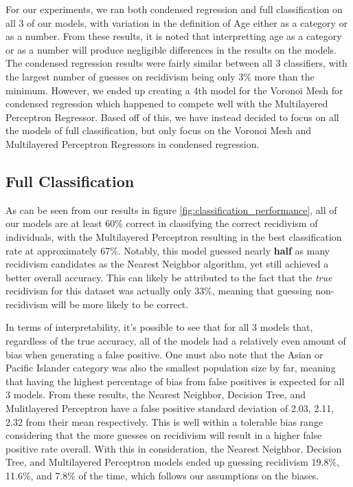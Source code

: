 \documentclass[sigconf]{acmart}
\begin{document}
    
    
For our experiments, we ran both condensed regression and full classification on all 3 of our models, with variation in the definition of Age either as a category or as a number. From these results, it is noted that interpretting age as a category or as a number will produce negligible differences in the results on the models. The condensed regression results were fairly similar between all 3 classifiers, with the largest number of guesses on recidivism being only 3\% more than the minimum. However, we ended up creating a 4th model for the Voronoi Mesh for condensed regression which happened to compete well with the Multilayered Perceptron Regressor.  Based off of this, we have instead decided to focus on all the models of full classification, but only focus on the Voronoi Mesh and Multilayered Perceptron Regressors in condensed regression.

\subsection{Full Classification}

As can be seen from our results in figure \ref{fig:classification_performance}, all of our models are at least 60\% correct in classifying the correct recidivism of individuals, with the Multilayered Perceptron resulting in the best classification rate at approximately 67\%. Notably, this model guessed nearly \textbf{half} as many recidivism candidates as the Nearest Neighbor algorithm, yet still achieved a better overall accuracy. This can likely be attributed to the fact that the \textit{true} recidivism for this dataset was actually only 33\%, meaning that guessing non-recidivism will be more likely to be correct.

In terms of interpretability, it's possible to see that for all 3 models that, regardless of the true accuracy, all of the models had a relatively even amount of bias when generating a false positive. One must also note that the Asian or Pacific Islander category was also the smallest population size by far, meaning that having the highest percentage of bias from false positives is expected for all 3 models. From these results, the Nearest Neighbor, Decision Tree, and Mulitlayered Perceptron have a false positive standard deviation of 2.03, 2.11, 2.32 from their mean respectively. This is well within a tolerable bias range considering that the more guesses on recidivism will result in a higher false positive rate overall. With this in consideration, the Nearest Neighbor, Decision Tree, and Multilayered Perceptron models ended up guessing recidivism 19.8\%, 11.6\%, and 7.8\% of the time, which follows our assumptions on the biases.
\end{document}
